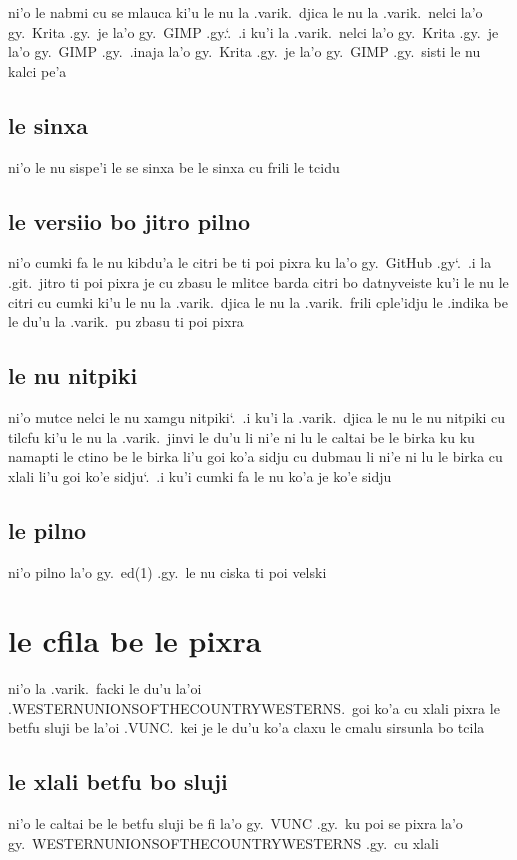 \documentclass{report}
\newcommand\sds{\spacefactor\sfcode`.\ \space}
\begin{document}
ni'o le nabmi cu se mlauca ki'u le nu la .varik.\ djica le nu la .varik.\ nelci la'o gy.\ Krita .gy.\ je la'o gy.\ GIMP .gy.\sds  .i ku'i la .varik.\ nelci la'o gy.\ Krita .gy.\ je la'o gy.\ GIMP .gy.\ .inaja la'o gy.\ Krita .gy.\ je la'o gy.\ GIMP .gy.\ sisti le nu kalci pe'a

\subsection{le sinxa}
ni'o le nu sispe'i le se sinxa be le sinxa cu frili le tcidu

\subsection{le versiio bo jitro pilno}
ni'o cumki fa le nu kibdu'a le citri be ti poi pixra ku la'o gy.\ GitHub .gy\sds  .i la .git.\ jitro ti poi pixra je cu zbasu le mlitce barda citri bo datnyveiste
ku'i le nu le citri cu cumki ki'u le nu la .varik.\ djica le nu la .varik.\ frili cple'idju le .indika be le du'u la .varik.\ pu zbasu ti poi pixra

\subsection{le nu nitpiki}
ni'o mutce nelci le nu xamgu nitpiki\sds  .i ku'i la .varik.\ djica le nu le nu nitpiki cu tilcfu ki'u le nu la .varik.\ jinvi le du'u li ni'e ni lu le caltai be le birka ku ku namapti le ctino be le birka li'u goi ko'a sidju cu dubmau li ni'e ni lu le birka cu xlali li'u goi ko'e sidju\sds  .i ku'i cumki fa le nu ko'a je ko'e sidju

\subsection{le pilno}
ni'o pilno la'o gy.\ ed(1) .gy.\ le nu ciska ti poi velski

\section{le cfila be le pixra}
ni'o la .varik.\ facki le du'u la'oi .WESTERNUNIONSOFTHECOUNTRYWESTERNS.\ goi ko'a cu xlali pixra le betfu sluji be la'oi .VUNC.\ kei je le du'u ko'a claxu le cmalu sirsunla bo tcila

\subsection{le xlali betfu bo sluji}
ni'o le caltai be le betfu sluji be fi la'o gy.\ VUNC .gy.\ ku poi se pixra la'o gy.\ WESTERNUNIONSOFTHECOUNTRYWESTERNS .gy.\ cu xlali
\end{document}
